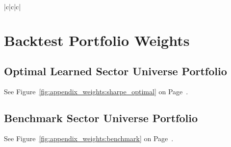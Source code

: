 \documentclass[../main.tex]{subfiles}
\begin{document}
\begin{center}
    \tabletail{\hline}
    \tablelasttail{\hline}
    \begin{supertabular}{|c|c|c|}
    \end{supertabular}
\end{center}



\onecolumn

\chapter{Backtest Portfolio Weights} \label{appendix:portfolio_weights}

\section*{Optimal Learned Sector Universe Portfolio}

See Figure~\ref{fig:appendix_weights:sharpe_optimal} on Page~\pageref{fig:appendix_weights:sharpe_optimal}.


\section*{Benchmark Sector Universe Portfolio}

See Figure~\ref{fig:appendix_weights:benchmark} on Page~\pageref{fig:appendix_weights:benchmark}.
\end{document}
